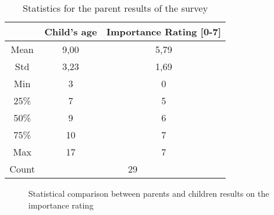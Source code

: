 \begin{table}[ht]
\centering
\caption{Statistics for the parent results of the survey}
\label{tab:stats_parents}
\begin{tabular}{c|c|c|}
\cline{2-3}
                            & \textbf{Child's age} & \textbf{Importance Rating {[}0-7{]}} \\ \hline
\multicolumn{1}{|c|}{Mean}  & 9,00                 & 5,79                                 \\ 
\multicolumn{1}{|c|}{Std}   & 3,23                 & 1,69                                 \\ 
\multicolumn{1}{|c|}{Min}   & 3                    & 0                                    \\ 
\multicolumn{1}{|c|}{25\%}  & 7                    & 5                                    \\ 
\multicolumn{1}{|c|}{50\%}  & 9                    & 6                                    \\ 
\multicolumn{1}{|c|}{75\%}  & 10                   & 7                                    \\ 
\multicolumn{1}{|c|}{Max}   & 17                   & 7                                    \\ \hline
\multicolumn{1}{|c|}{Count} & \multicolumn{2}{c|}{29}                                     \\ \hline
\end{tabular}
\end{table}

\begin{figure}[ht]
    \centering
    \caption{Statistical comparison between parents and children results on the importance rating}
    \label{fig:box_plots}
\end{figure}



